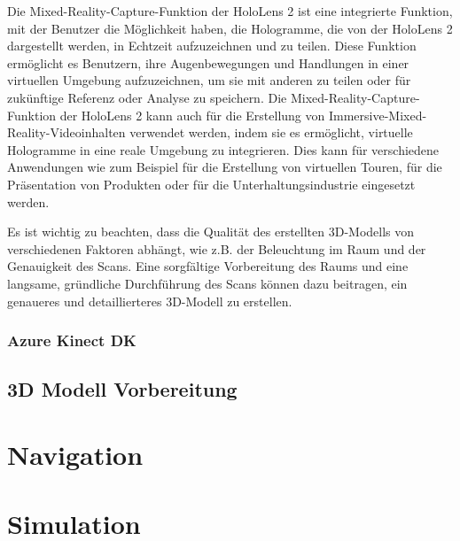         Die Mixed-Reality-Capture-Funktion der HoloLens 2 ist eine integrierte Funktion, mit der Benutzer die Möglichkeit haben, die Hologramme, die von der HoloLens 2 dargestellt werden, in Echtzeit aufzuzeichnen und zu teilen. Diese Funktion ermöglicht es Benutzern, ihre Augenbewegungen und Handlungen in einer virtuellen Umgebung aufzuzeichnen, um sie mit anderen zu teilen oder für zukünftige Referenz oder Analyse zu speichern. Die Mixed-Reality-Capture-Funktion der HoloLens 2 kann auch für die Erstellung von Immersive-Mixed-Reality-Videoinhalten verwendet werden, indem sie es ermöglicht, virtuelle Hologramme in eine reale Umgebung zu integrieren. Dies kann für verschiedene Anwendungen wie zum Beispiel für die Erstellung von virtuellen Touren, für die Präsentation von Produkten oder für die Unterhaltungsindustrie eingesetzt werden.
        

        Es ist wichtig zu beachten, dass die Qualität des erstellten 3D-Modells von verschiedenen Faktoren abhängt, wie z.B. der Beleuchtung im Raum und der Genauigkeit des Scans. Eine sorgfältige Vorbereitung des Raums und eine langsame, gründliche Durchführung des Scans können dazu beitragen, ein genaueres und detaillierteres 3D-Modell zu erstellen.
        \subsubsection{Azure Kinect \ac{DK}}

    \subsection{3D Modell Vorbereitung}

\section{Navigation}

\section{Simulation}



